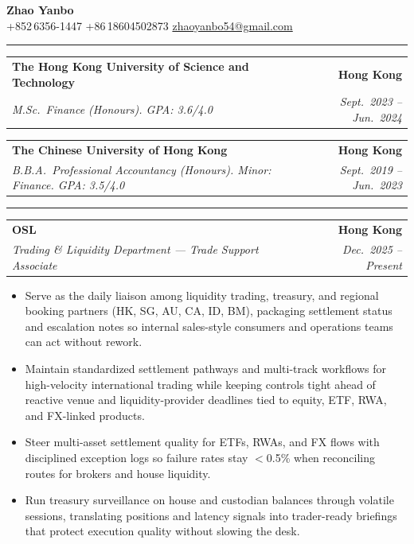 \documentclass[9pt,a4paper]{extarticle}
\makeatletter
\newcommand{\ressection}[1]{%
  \vspace{0.8em}%
  \noindent{\large\scshape\bfseries #1}\par\nobreak
  \vspace{-\parskip}%
  \vspace{-\parskip}%
  \vspace{-\parskip}%
  \vspace{-\parskip}%
  \noindent\rule{\linewidth}{0.1pt}\par\nobreak
  \vspace{-\parskip}%
}
\newcommand{\resumeSubheading}[4]{%
  \vspace{0.6em}%
  \begin{tabular*}{\textwidth}{l@{\extracolsep{\fill}}r}
    \textbf{#1} & \textbf{#2} \\
    \textit{\small #3} & \textit{\small #4} \\
  \end{tabular*}\vspace{0.32em}}
\makeatother
\begin{document}
\begin{center}
  {\LARGE\bfseries Zhao Yanbo}\\[0.35em]
  \small
  +852\,6356-1447 \;\textbar\;
  +86\,18604502873 \;\textbar\;
  \href{mailto:zhaoyanbo54@gmail.com}{zhaoyanbo54@gmail.com}
\end{center}
\vspace{-0.2em}

\ressection{Education}

\resumeSubheading{The Hong Kong University of Science and Technology}{Hong Kong}{M.Sc.\ Finance (Honours). GPA: 3.6/4.0}{Sept.\ 2023 -- Jun.\ 2024}

\resumeSubheading{The Chinese University of Hong Kong}{Hong Kong}{B.B.A.\ Professional Accountancy (Honours). Minor: Finance. GPA: 3.5/4.0}{Sept.\ 2019 -- Jun.\ 2023}

\ressection{Work Experience}

\resumeSubheading{OSL}{Hong Kong}{Trading \& Liquidity Department --- Trade Support Associate}{Dec.\ 2025 -- Present}
\begin{itemize}
  \item Serve as the daily liaison among liquidity trading, treasury, and regional booking partners (HK, SG, AU, CA, ID, BM), packaging settlement status and escalation notes so internal sales-style consumers and operations teams can act without rework.
  \item Maintain standardized settlement pathways and multi-track workflows for high-velocity international trading while keeping controls tight ahead of reactive venue and liquidity-provider deadlines tied to equity, ETF, RWA, and FX-linked products.
  \item Steer multi-asset settlement quality for ETFs, RWAs, and FX flows with disciplined exception logs so failure rates stay $<$0.5\% when reconciling routes for brokers and house liquidity.
  \item Run treasury surveillance on house and custodian balances through volatile sessions, translating positions and latency signals into trader-ready briefings that protect execution quality without slowing the desk.
\end{itemize}
\end{document}

